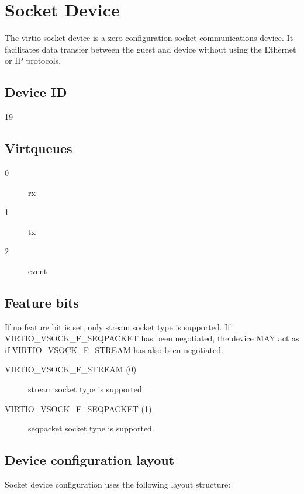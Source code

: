 \section{Socket Device}\label{sec:Device Types / Socket Device}

The virtio socket device is a zero-configuration socket communications device.
It facilitates data transfer between the guest and device without using the
Ethernet or IP protocols.

\subsection{Device ID}\label{sec:Device Types / Socket Device / Device ID}
  19

\subsection{Virtqueues}\label{sec:Device Types / Socket Device / Virtqueues}
\begin{description}
\item[0] rx
\item[1] tx
\item[2] event
\end{description}

\subsection{Feature bits}\label{sec:Device Types / Socket Device / Feature bits}

If no feature bit is set, only stream socket type is supported.
If VIRTIO_VSOCK_F_SEQPACKET has been negotiated, the device MAY act
as if VIRTIO_VSOCK_F_STREAM has also been negotiated.

\begin{description}
\item[VIRTIO_VSOCK_F_STREAM (0)] stream socket type is supported.
\item[VIRTIO_VSOCK_F_SEQPACKET (1)] seqpacket socket type is supported.
\end{description}

\subsection{Device configuration layout}\label{sec:Device Types / Socket Device / Device configuration layout}

Socket device configuration uses the following layout structure:

